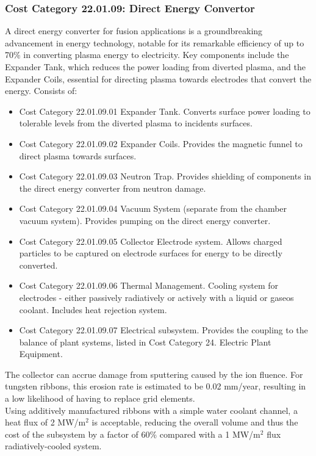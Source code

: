 \subsubsection*{Cost Category 22.01.09: Direct Energy Convertor}

A direct energy converter for fusion applications is a groundbreaking advancement in energy technology, notable for its remarkable efficiency of up to 70\% in converting plasma energy to electricity. Key components include the Expander Tank, which reduces the power loading from diverted plasma, and the Expander Coils, essential for directing plasma towards electrodes that convert the energy.  Consists of:

\begin{itemize}
    \item Cost Category 22.01.09.01 Expander Tank. Converts surface power loading to tolerable levels from the diverted plasma to incidents surfaces.
    \item Cost Category 22.01.09.02 Expander Coils.  Provides the magnetic funnel to direct plasma towards surfaces.
    \item Cost Category 22.01.09.03 Neutron Trap.  Provides shielding of components in the direct energy converter from neutron damage.
    \item Cost Category 22.01.09.04 Vacuum System (separate from the chamber vacuum system).  Provides pumping on the direct energy converter.
    \item Cost Category 22.01.09.05 Collector Electrode system.  Allows charged particles to be captured on electrode surfaces for energy to be directly converted.
    \item Cost Category 22.01.09.06 Thermal Management.  Cooling system for electrodes - either passively radiatively or actively with a liquid or gaseos coolant.  Includes heat rejection system.
    \item Cost Category 22.01.09.07 Electrical subsystem.  Provides the coupling to the balance of plant systems, listed in Cost Category 24. Electric Plant Equipment.
\end{itemize}


The collector can accrue damage from sputtering caused by the ion fluence. For tungsten ribbons, this erosion rate is estimated to be 0.02 mm/year, resulting in a low likelihood of having to replace grid elements.\\

Using additively manufactured ribbons with a simple water coolant channel, a heat flux of 2 MW/m$^2$ is acceptable, reducing the overall volume and thus the cost of the subsystem by a factor of 60\% compared with a 1 MW/m$^2$ flux radiatively-cooled system.\\


